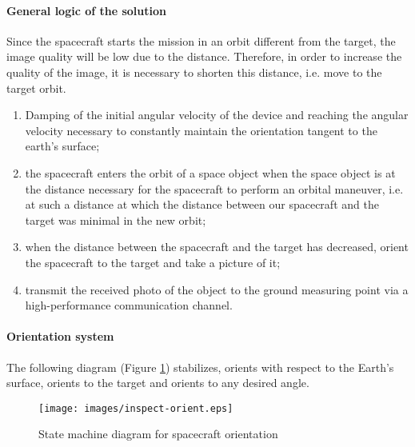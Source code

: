 \documentclass[12pt,a4paper]{article}
\begin{document}
\paragraph{General logic of the solution} 

Since the spacecraft starts the mission in an orbit different from the target, the image quality will be low due to the distance. Therefore, in order to increase the quality of the image, it is necessary to shorten this distance, i.e. move to the target orbit.

\begin{enumerate}
\item Damping of the initial angular velocity of the device and reaching the angular velocity necessary to constantly maintain the orientation tangent to the earth's surface;
\item the spacecraft enters the orbit of a space object when the space object is at the distance necessary for the spacecraft to perform an orbital maneuver, i.e. at such a distance at which the distance between our spacecraft and the target was minimal in the new orbit;
\item when the distance between the spacecraft and the target has decreased, orient the spacecraft to the target and take a picture of it;
\item transmit the received photo of the object to the ground measuring point via a high-performance communication channel.
\end{enumerate}

\paragraph{Orientation system} The following diagram (Figure \ref{Pic:INSPECT-orient-en}) stabilizes, orients with respect to the Earth's surface, orients to the target and orients to any desired angle.

\begin{figure}[tbh]
  \begin{center}
    \texttt{[image: images/inspect-orient.eps]}
    \caption{State machine diagram for spacecraft orientation}
    \label{Pic:INSPECT-orient-en}
  \end{center}
\end{figure}
\end{document}
